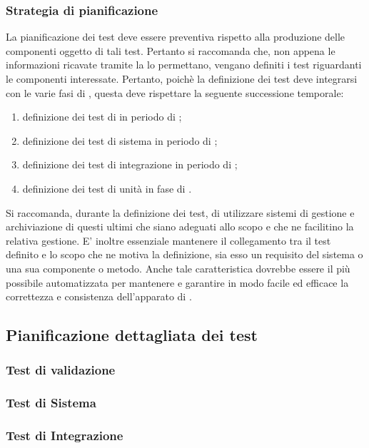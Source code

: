 \documentclass[12pt,a4paper]{article}
\begin{document}
\subsubsection{Strategia di pianificazione}
La pianificazione dei test deve essere preventiva rispetto alla produzione delle componenti oggetto di tali test. Pertanto si raccomanda che, non appena le informazioni ricavate tramite la  lo permettano, vengano definiti i test riguardanti le componenti interessate.
Pertanto, poichè la definizione dei test deve integrarsi con le varie fasi di , questa deve rispettare la seguente successione temporale:
\begin{enumerate}
	\item definizione dei test di   in periodo di \FA;
	\item definizione dei test di sistema in periodo di \FAD;
	\item definizione dei test di integrazione in periodo di \FPA;
	\item definizione dei test di unità in fase di \FPD.
	\end{enumerate}
Si raccomanda, durante la definizione dei test, di utilizzare sistemi di gestione e archiviazione di questi ultimi che siano adeguati allo scopo e che ne facilitino la relativa gestione. E' inoltre essenziale mantenere il collegamento tra il test definito e lo scopo che ne motiva la definizione, sia esso un requisito del sistema o una sua componente o metodo. Anche tale caratteristica dovrebbe essere il più possibile automatizzata per mantenere e garantire in modo facile ed efficace la correttezza e consistenza dell'apparato di .

\subsection{Pianificazione dettagliata dei test}\label{test_pianificazione}
\subsubsection{Test di validazione}\label{test_validazione}
\subsubsection{Test di Sistema}\label{test_sistema}
\subsubsection{Test di Integrazione}\label{test_integrazione}
\end{document}

